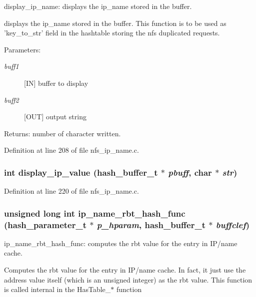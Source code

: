 display\_\-ip\_\-name: displays the ip\_\-name stored in the buffer.

displays the ip\_\-name stored in the buffer. This function is to be used as 'key\_\-to\_\-str' field in the hashtable storing the nfs duplicated requests.

\begin{Desc}
\item[Parameters:]
\begin{description}
\item[{\em buff1}][IN] buffer to display \item[{\em buff2}][OUT] output string\end{description}
\end{Desc}
\begin{Desc}
\item[Returns:]number of character written. \end{Desc}


Definition at line 208 of file nfs\_\-ip\_\-name.c.
\subsubsection{\setlength{\rightskip}{0pt plus 5cm}int display\_\-ip\_\-value (hash\_\-buffer\_\-t $\ast$ {\em pbuff}, char $\ast$ {\em str})}\label{nfs__ip__name_8c_a7}




Definition at line 220 of file nfs\_\-ip\_\-name.c.
\subsubsection{\setlength{\rightskip}{0pt plus 5cm}unsigned long int ip\_\-name\_\-rbt\_\-hash\_\-func (hash\_\-parameter\_\-t $\ast$ {\em p\_\-hparam}, hash\_\-buffer\_\-t $\ast$ {\em buffclef})}\label{nfs__ip__name_8c_a4}


ip\_\-name\_\-rbt\_\-hash\_\-func: computes the rbt value for the entry in IP/name cache.

Computes the rbt value for the entry in IP/name cache. In fact, it just use the address value itself (which is an unsigned integer) as the rbt value. This function is called internal in the Has\-Table\_\-$\ast$ function

